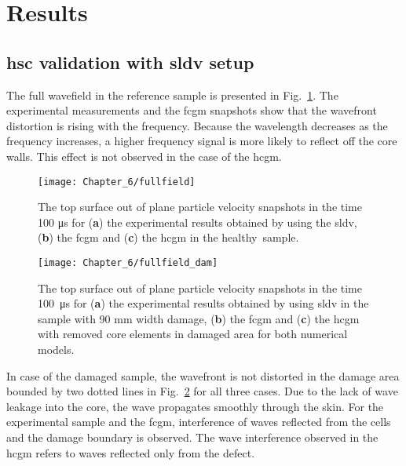 \section{Results}
\label{sec:resuls}
\subsection{\acs{hsc} validation with \acs{sldv} setup}
The full wavefield in the reference sample is presented in Fig.~\ref{fig:wavefield}.
The experimental measurements and the \ac{fcgm} snapshots show that the wavefront distortion is rising with the frequency.
Because the wavelength decreases as the frequency increases, a higher frequency signal is more likely to reflect off the core walls.
This effect is not observed in the case of the \ac{hcgm}.
\vspace{-6pt}
\begin{figure}[H]
	\begin{center}
		\texttt{[image: Chapter\_6/fullfield]}
	\end{center}
	\caption{The top surface out of plane particle velocity snapshots in the time 100 \unit{\micro\second} for (\textbf{a}) the experimental results obtained by using the \acf{sldv}, (\textbf{b}) the \acf{fcgm} and (\textbf{c}) the \acf{hcgm} in the healthy~sample.}
	\label{fig:wavefield}
\end{figure}

\begin{figure}[H]
	\begin{center}
		\texttt{[image: Chapter\_6/fullfield\_dam]}
	\end{center}
	\caption{The top surface out of plane particle velocity snapshots in the time 100~\unit{\micro\second} for (\textbf{a}) the experimental results obtained by using \ac{sldv} in the sample with 90 \unit{\mm} width damage, (\textbf{b}) the \acf{fcgm} and (\textbf{c}) the \acf{hcgm} with removed core elements in damaged area for both numerical models.}
	\label{fig:wavefield_dam5}
\end{figure}

In case of the damaged sample, the wavefront is not distorted in the damage area bounded by two dotted lines in Fig.~\ref{fig:wavefield_dam5} for all three cases.
Due to the lack of wave leakage into the core, the wave propagates smoothly through the skin.
For the experimental sample and the \ac{fcgm}, interference of waves reflected from the cells and the damage boundary is observed.
The wave interference observed in the \ac{hcgm} refers to waves reflected only from the defect.

